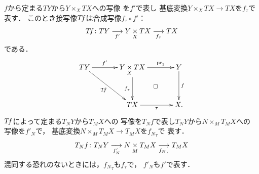 \(f\)から定まる\(TY\)から\(Y\times_{X}TX\)への写像
を\(f'\)で表し
基底変換\(Y\times_{X}TX\to TX\)を\(f_{\tau}\)で表す．
このとき接写像\(\mtan[f]\)は合成写像\(f_{\tau}\circ f'\)：
\begin{equation}
    \mtan[f]\colon TY\underset{f'}{\longrightarrow}
    Y\pb[X]TX\underset{f_{\tau}}{\longrightarrow} TX
\end{equation}
である．
\[
    \vcenter{\xymatrix@C=36pt@R=36pt{
    TY
    \ar[rd]_-{\mtan[f]}
    \ar[r]^-{f'}
    &
    Y\pb[X] TX
    \ar@{}[dr]|\square
    \ar[d]_-{f_{\tau}}
    \ar[r]^-{\pr_1}
    &
    Y
    \ar[d]^-{f}
    \\
    &
    TX
    \ar[r]_-{\tau}
    &
    X.
  }}
\]
\(\mtan[f]\)によって定まる\(T_{N}Y\)から\(T_{M}X\)への
写像を\(T_{N}f\)で表し\(T_{N}Y\)から\(N\times_{M}T_{M}X\)への
写像を\(f'_{N}\)で，
基底変換\(N\times_{M}T_{M}X\to T_{M}X\)を\({f_{N}}_{\tau}\)で
表す．
\begin{equation}
    T_{N}f\colon T_{N}Y\underset{f'_{N}}{\longrightarrow}
    N\pb[M]T_{M}X\underset{{f_{N}}_{\tau}}{\longrightarrow} T_{M}X
\end{equation}
混同する恐れのないときには，\({f_{N}}_{\tau}\)も\(f_{\tau}\)で，
\({f'_{N}}\)も\(f'\)で表す．


